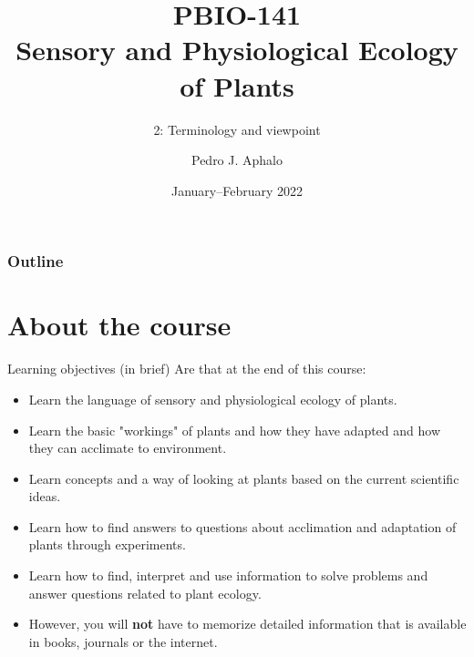 \documentclass[10pt]{beamer}
\begin{document}
\title{PBIO-141\\Sensory and Physiological Ecology\\of  Plants}
\subtitle{2: Terminology and viewpoint}
\author{Pedro J. Aphalo}
\date{January--February 2022}

\begin{frame}
\maketitle
\end{frame}



\begin{frame}
    \frametitle{Outline}
    \tableofcontents
\end{frame}

\section{About the course}

\begin{frame}{Learning objectives (in brief)}
    Are that at the end of this course:
    \begin{itemize}
    \item Learn the language of sensory and physiological ecology of plants.
    \item Learn the basic "workings" of plants and how they have adapted and how they can acclimate to environment.
    \item Learn concepts and a way of looking at plants based on the current scientific ideas.
    \item Learn how to find answers to questions about acclimation and adaptation of plants through experiments.
    \item Learn how to find, interpret and use information to solve problems and answer questions related to plant ecology.
    \item However, you will \textbf{not} have to memorize detailed information that is available in books, journals or the internet.
    \end{itemize}
\end{frame}
\end{document}
